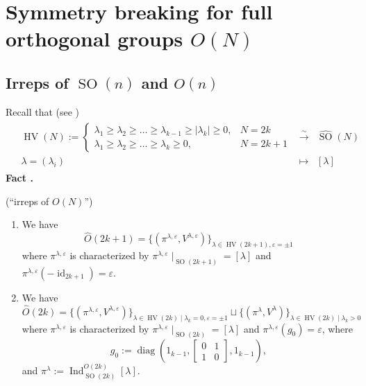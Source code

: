 \documentclass{article}
\newcommand{\assign}{:=}
\newcommand{\comma}{{,}}
\newcommand{\tmop}[1]{\ensuremath{\operatorname{#1}}}
\newcommand{\tmtextbf}[1]{{\bfseries{#1}}}
\newcommand{\tmtextit}[1]{{\itshape{#1}}}
\newcommand{\tmtextup}[1]{{\upshape{#1}}}
\begin{document}
\

\

\

\section{Symmetry breaking for full orthogonal groups $O (N)$}{}

\subsection{Irreps of $\tmop{SO} (n)$ and $O (n)$}{}

Recall that (see {\cite{knapp2013lie}})
\begin{eqnarray}
  & \begin{array}{lll}
    \tmop{HV} (N) \assign \left\{ \begin{array}{ll}
      \lambda_1 \geqslant \lambda_2 \geqslant \ldots \geqslant \lambda_{k - 1}
      \geqslant | \lambda_k | \geqslant 0, & N = 2 k\\
      \lambda_1 \geqslant \lambda_2 \geqslant \ldots \geqslant \lambda_k
      \geqslant 0, & N = 2 k + 1
    \end{array} \right. & \xrightarrow{\sim} & \widehat{\tmop{SO}} (N)\\
    \lambda = (\lambda_i) & \mapsto & [\lambda]
  \end{array} &  \nonumber
\end{eqnarray}
{\noindent}\tmtextbf{Fact \tmtextup{3}. }\tmtextit{{\cite[Sec.
5.5.5]{goodman2000representations}} (``irreps of $O (N)$'')
\begin{enumerate}
  \item We have
  \[ \hat{O} (2 k + 1) = \{ (\pi^{\lambda, \varepsilon}, V^{\lambda,
     \varepsilon}) \}_{\lambda \in \tmop{HV} (2 k + 1), \varepsilon = \pm 1}
  \]
  where $\pi^{\lambda, \varepsilon}$ is characterized by $\pi^{\lambda,
  \varepsilon} \mid_{\tmop{SO} (2 k + 1)} = [\lambda]$ and $\pi^{\lambda,
  \varepsilon} (- \tmop{id}_{2 k + 1}) = \varepsilon$.
  
  \item We have
  \[ \hat{O} (2 k) = \{ (\pi^{\lambda, \varepsilon}, V^{\lambda \comma
     \varepsilon}) \}_{\lambda \in \tmop{HV} (2 k) \mid \lambda_k = 0,
     \varepsilon = \pm 1} \sqcup \{ (\pi^{\lambda}, V^{\lambda}) \}_{\lambda
     \in \tmop{HV} (2 k) \mid \lambda_k > 0} \]
  where $\pi^{\lambda, \varepsilon}$ is characterized by $\pi^{\lambda,
  \varepsilon} \mid_{\tmop{SO} (2 k)} = [\lambda]$ and $\pi^{\lambda,
  \varepsilon} (g_0) = \varepsilon$, where
  \[ g_0 \assign \tmop{diag} \left( 1_{k - 1}, \left[ \begin{array}{ll}
       0 & 1\\
       1 & 0
     \end{array} \right], 1_{k - 1} \right), \]
  and $\pi^{\lambda} \assign \tmop{Ind}_{\tmop{SO} (2 k)}^{O (2 k)}
  [\lambda]$.
\end{enumerate}}{\hspace*{\fill}}{\medskip}
\end{document}
